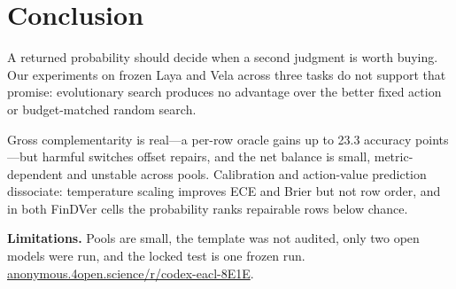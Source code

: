 \section{Conclusion}

A returned probability should decide when a second judgment is worth buying.
Our experiments on frozen Laya and Vela across three tasks do not support that
promise: evolutionary search produces no advantage over the better fixed action
or budget-matched random search.

Gross complementarity is real---a per-row oracle gains up to 23.3 accuracy
points---but harmful switches offset repairs, and the net balance is small,
metric-dependent and unstable across pools. Calibration and action-value
prediction dissociate: temperature scaling
improves ECE and Brier but not row order, and in both FinDVer cells the
probability ranks repairable rows below chance.

\textbf{Limitations.} Pools are small, the \noul{} template was not audited,
only two open models were run, and the locked test is one frozen run.
\href{https://anonymous.4open.science/r/codex-eacl-8E1E/}{anonymous.4open.science/r/codex-eacl-8E1E}.